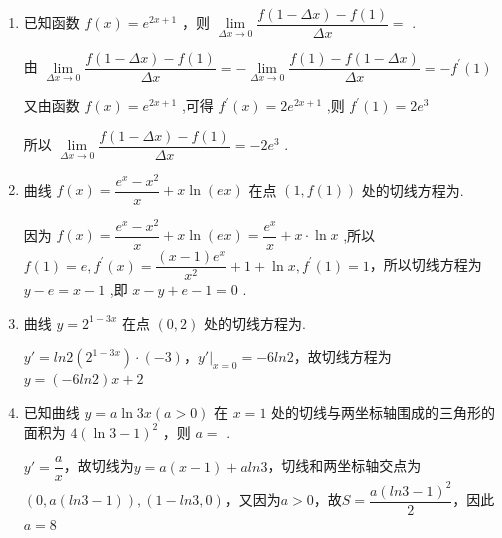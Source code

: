 \begin{enumerate}
    \item 已知函数 $f\left( x\right)  = {{e}}^{{2x} + 1}$ ，则 $\mathop{\lim }\limits_{{{\Delta x} \rightarrow  0}}\dfrac{f\left( {1 - {\Delta x}}\right)  - f\left( 1\right) }{\Delta x} =$ .
    \begin{jieda}
        由 $\mathop{\lim }\limits_{{{\Delta x} \rightarrow  0}}\dfrac{f\left( {1 - {\Delta x}}\right)  - f\left( 1\right) }{\Delta x} =  - \mathop{\lim }\limits_{{{\Delta x} \rightarrow  0}}\dfrac{f\left( 1\right)  - f\left( {1 - {\Delta x}}\right) }{\Delta x} =  - {f}^{\prime }\left( 1\right)$ 
        
        又由函数 $f\left( x\right)  = {{e}}^{{2x} + 1}$ ,可得 ${f}^{\prime }\left( x\right)  = 2{{e}}^{{2x} + 1}$ ,则 ${f}^{\prime }\left( 1\right)  = 2{{e}}^{3}$
        
        所以 $\mathop{\lim }\limits_{{{\Delta x} \rightarrow  0}}\dfrac{f\left( {1 - {\Delta x}}\right)  - f\left( 1\right) }{\Delta x} =  - 2{{e}}^{3}$ .
    \end{jieda}
    
    \item 曲线 $f\left( x\right)  = \dfrac{{{e}}^{x} - {x}^{2}}{x} + x\ln \left( {{e}x}\right)$ 在点 $\left( {1,f\left( 1\right) }\right)$ 处的切线方程为.
    \begin{jieda}
        因为 $f\left( x\right)  = \dfrac{{{e}}^{x} - {x}^{2}}{x} + x\ln \left( {{e}x}\right)  = \dfrac{{{e}}^{x}}{x} + x \cdot  \ln x$ ,所以$f\left( 1\right)  = {e},{f}^{\prime }\left( x\right)  = \dfrac{\left( {x - 1}\right) {{e}}^{x}}{{x}^{2}} + 1 + \ln x,{f}^{\prime }\left( 1\right)  = 1$，所以切线方程为 $y - {e} = x - 1$ ,即 $x - y + {e} - 1 = 0$ .
    \end{jieda}
    
    \item 曲线 $y = {2}^{1 - {3x}}$ 在点 $\left( {0,2}\right)$ 处的切线方程为.
    \begin{jieda}
        $y' = ln2(2^{1-3x}) \cdot (-3)$，$y'|_{x=0} = -6ln2$，故切线方程为$y = (-6ln2)x+2$
    \end{jieda}
    
    \item 已知曲线 $y = a\ln {3x}\left( {a > 0}\right)$ 在 $x = 1$ 处的切线与两坐标轴围成的三角形的面积为 $4{\left( \ln 3 - 1\right) }^{2}$ ，则 $a =$ .
    \begin{jieda}
        $y' = \dfrac{a}{x}$，故切线为$y = a(x-1)+aln3$，切线和两坐标轴交点为$(0, a(ln3-1)), (1-ln3, 0)$，又因为$a>0$，故$S = \dfrac{a(ln3-1)^2}{2}$，因此$a = 8$
    \end{jieda}
    

\end{enumerate}
